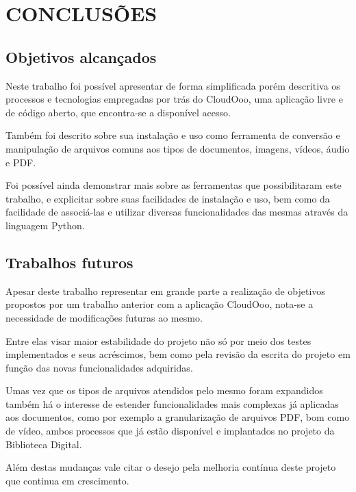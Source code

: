 \chapter{CONCLUSÕES}

\section{Objetivos alcançados}

Neste trabalho foi possível apresentar de forma simplificada porém descritiva os processos e tecnologias empregadas por trás do CloudOoo, uma aplicação livre e de código aberto, que encontra-se a disponível acesso.

Também foi descrito sobre sua instalação e uso como ferramenta de conversão e manipulação de arquivos comuns aos tipos de documentos, imagens, vídeos, áudio e PDF.

Foi possível ainda demonstrar mais sobre as ferramentas que possibilitaram este trabalho, e explicitar sobre suas facilidades de instalação e uso, bem como da facilidade de associá-las e utilizar diversas funcionalidades das mesmas através da linguagem Python.

\section{Trabalhos futuros}

Apesar deste trabalho representar em grande parte a realização de objetivos propostos por um trabalho anterior com a aplicação CloudOoo, nota-se a necessidade de modificações futuras ao mesmo.

Entre elas visar maior estabilidade do projeto não só por meio dos testes implementados e seus acréscimos, bem como pela revisão da escrita do projeto em função das novas funcionalidades adquiridas.

Umas vez que os tipos de arquivos atendidos pelo mesmo foram expandidos também há o interesse de estender funcionalidades mais complexas já aplicadas aos documentos, como por exemplo a granularização de arquivos PDF, bom como de vídeo, ambos processos que já estão disponível e implantados no projeto da Biblioteca Digital.

Além destas mudanças vale citar o desejo pela melhoria contínua deste projeto que continua em crescimento.
